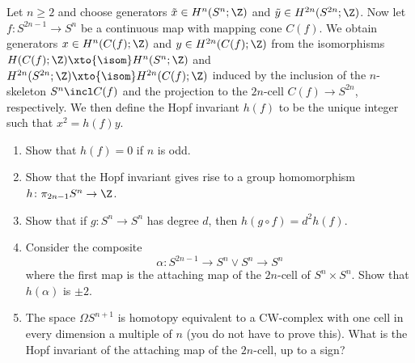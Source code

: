 \begin{exercise}
	Let $n \geq 2$ and choose generators $\tilde{x} \in H^n(S^n; \Z)$ and $\tilde{y} \in H^{2n}(S^{2n}; \Z)$.
	Now let $f\colon S^{2n - 1} \to S^n$ be a continuous map with mapping cone $C(f)$.
	We obtain generators $x \in H^n(C(f); \Z)$ and $y \in H^{2n}(C(f); \Z)$ from the isomorphisms $H(C(f); \Z) \xto{\isom} H^n(S^n; \Z)$ and $H^{2n}(S^{2n}; \Z) \xto{\isom} H^{2n}(C(f); \Z)$ induced by the inclusion of the $n$-skeleton $S^n \incl C(f)$ and the projection to the $2n$-cell $C(f) \to S^{2n}$, respectively.
	We then define the Hopf invariant $h(f)$ to be the unique integer such that $x^2 = h(f) y$.
	\begin{enumerate}
		\item Show that $h(f) = 0$ if $n$ is odd.
		\item Show that the Hopf invariant gives rise to a group homomorphism $h\colon \pi_{2n - 1} S^n \to \Z$.
		\item Show that if $g\colon S^n \to S^n$ has degree $d$, then $h(g \circ f) = d^2 h(f)$.
		\item Consider the composite
			\begin{equation*}
				\alpha\colon S^{2n - 1} \to S^n \vee S^n \to S^n
			\end{equation*}
			where the first map is the attaching map of the $2n$-cell of $S^n \times S^n$.
			Show that $h(\alpha)$ is $\pm 2$.
		\item The space $\Omega S^{n + 1}$ is homotopy equivalent to a CW-complex with one cell in every dimension a multiple of $n$ (you do not have to prove this).
			What is the Hopf invariant of the attaching map of the $2n$-cell, up to a sign?
	\end{enumerate}
\end{exercise}
